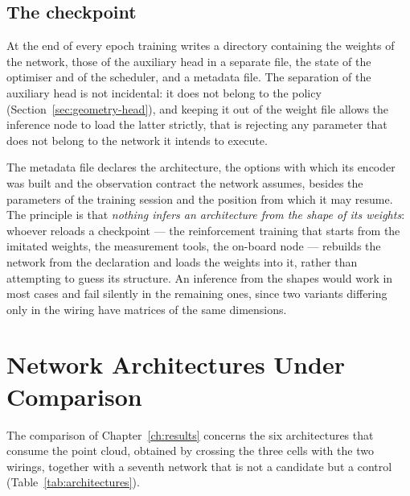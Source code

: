 \subsection{The checkpoint}

At the end of every epoch training writes a directory containing the weights of
the network, those of the auxiliary head in a separate file, the state of the
optimiser and of the scheduler, and a metadata file. The separation of the
auxiliary head is not incidental: it does not belong to the policy
(Section~\ref{sec:geometry-head}), and keeping it out of the weight file allows
the inference node to load the latter strictly, that is rejecting any parameter
that does not belong to the network it intends to execute.

The metadata file declares the architecture, the options with which its encoder
was built and the observation contract the network assumes, besides the
parameters of the training session and the position from which it may resume.
The principle is that \emph{nothing infers an architecture from the shape of its
weights}: whoever reloads a checkpoint --- the reinforcement training that
starts from the imitated weights, the measurement tools, the on-board node ---
rebuilds the network from the declaration and loads the weights into it, rather
than attempting to guess its structure. An inference from the shapes would work
in most cases and fail silently in the remaining ones, since two variants
differing only in the wiring have matrices of the same dimensions.

\section{Network Architectures Under Comparison}
\label{sec:networks-implementation}

The comparison of Chapter~\ref{ch:results} concerns the six architectures that
consume the point cloud, obtained by crossing the three cells with the two
wirings, together with a seventh network that is not a candidate but a control
(Table~\ref{tab:architectures}).


